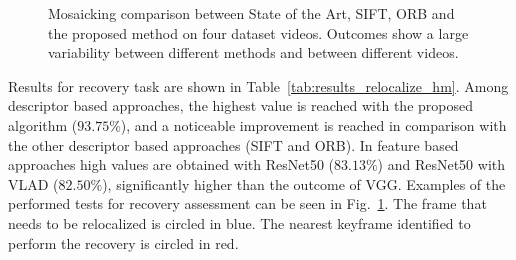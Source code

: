 \documentclass[sn-basic]{sn-jnl}%
\begin{document}
\begin{figure}[t!]
    \centering
        
    \caption{Mosaicking comparison between State of the Art, SIFT, ORB and the proposed method on four dataset videos. Outcomes show a large variability between different methods and between different videos.}
    \label{fig:examples_mosaicking}
\end{figure}

Results for recovery task are shown in Table~\ref{tab:results_relocalize_hm}.
Among descriptor based approaches, the highest value is reached with the proposed algorithm ($93.75\%$), and a noticeable improvement is reached in comparison with the other descriptor based approaches (SIFT and ORB). 
In feature based approaches high values are obtained with ResNet50 ($83.13\%$) and ResNet50 with VLAD ($82.50\%$), significantly higher than the outcome of VGG. Examples of the performed tests for recovery assessment can be seen in Fig.~\ref{fig:examples_mosaicking}. 
The frame that needs to be relocalized is circled in blue. The nearest keyframe identified to perform the recovery is circled in red. 
\end{document}
